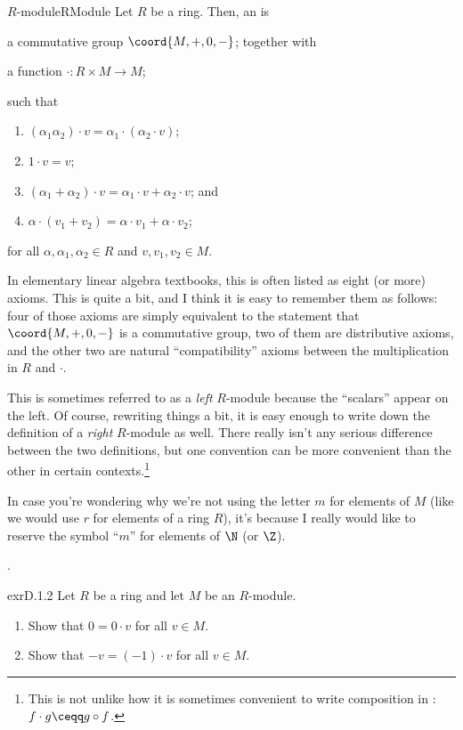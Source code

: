 \begin{dfn}{$R$-module}{RModule}
Let $R$ be a ring.  Then, an   is
\begin{data}
\item a commutative group $\coord{M,+,0,-}$; together with
\item a function $\cdot \colon R\times M\rightarrow M$;
\end{data}
such that
\begin{enumerate}
\item $(\alpha _1\alpha _2)\cdot v=\alpha _1\cdot (\alpha _2\cdot v)$;
\item $1\cdot v=v$;
\item $(\alpha _1+\alpha _2)\cdot v=\alpha _1\cdot v+\alpha _2\cdot v$; and
\item $\alpha \cdot (v_1+v_2)=\alpha \cdot v_1+\alpha \cdot v_2$;
\end{enumerate}
for all $\alpha ,\alpha _1,\alpha _2\in R$ and $v,v_1,v_2\in M$.
\begin{rmk}
In elementary linear algebra textbooks, this is often listed as eight (or more) axioms.  This is quite a bit, and I think it is easy to remember them as follows:  four of those axioms are simply equivalent to the statement that $\coord{M,+,0,-}$ is a commutative group, two of them are distributive axioms, and the other two are natural ``compatibility'' axioms between the multiplication in $R$ and $\cdot$.
\end{rmk}
\begin{rmk}
This is sometimes referred to as a \emph{left} $R$-module because the ``scalars'' appear on the left.  Of course, rewriting things a bit, it is easy enough to write down the definition of a \emph{right} $R$-module as well.  There really isn't any serious difference between the two definitions, but one convention can be more convenient than the other in certain contexts.\footnote{This is not unlike how it is sometimes convenient to write composition in :  $f\cdot g\ceqq g\circ f$.}
\end{rmk}
\begin{rmk}
In case you're wondering why we're not using the letter $m$ for elements of $M$ (like we would use $r$ for elements of a ring $R$), it's because I really would like to reserve the symbol ``$m$'' for elements of $\N$ (or $\Z$).
\end{rmk}
\end{dfn}.
\begin{exr}{}{exrD.1.2}
Let $R$ be a ring and let $M$ be an $R$-module.
\begin{enumerate}
\item Show that $0=0\cdot v$ for all $v\in M$.
\item Show that $-v=(-1)\cdot v$ for all $v\in M$.
\end{enumerate}
\end{exr}
